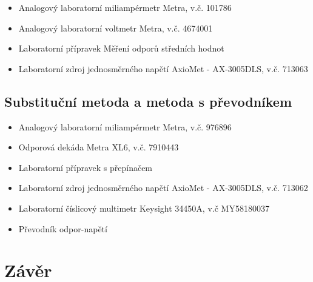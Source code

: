 \documentclass[a4paper, czech]{article}
\begin{document}
\begin{itemize}
    \item Analogový laboratorní miliampérmetr Metra, v.č. 101786
    \item Analogový laboratorní voltmetr Metra, v.č. 4674001
    \item Laboratorní přípravek Měření odporů středních hodnot
    \item Laboratorní zdroj jednosměrného napětí AxioMet - AX-3005DLS, v.č. 713063
\end{itemize}

\subsection{Substituční metoda a metoda s převodníkem}

\begin{itemize}
    \item Analogový laboratorní miliampérmetr Metra, v.č. 976896
    \item Odporová dekáda Metra XL6, v.č. 7910443
    \item Laboratorní přípravek s přepínačem
    \item Laboratorní zdroj jednosměrného napětí AxioMet - AX-3005DLS, v.č. 713062
    \item Laboratorní číslicový multimetr Keysight 34450A, v.č MY58180037
    \item Převodník odpor-napětí
\end{itemize}

\section{Závěr}
\end{document}
